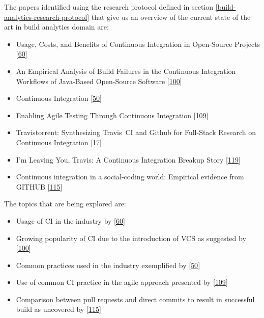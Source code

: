 \documentclass[]{book}
\providecommand{\tightlist}{%
  \setlength{\itemsep}{0pt}\setlength{\parskip}{0pt}}
\begin{document}
The papers identified using the research protocol defined in section
\ref{build-analytics-research-protocol} that give us an overview of the
current state of the art in build analytics domain are:

\begin{itemize}
\tightlist
\item
  Usage, Costs, and Benefits of Continuous Integration in Open-Source
  Projects {[}\protect\hyperlink{ref-hilton2016usage}{60}{]}
\item
  An Empirical Analysis of Build Failures in the Continuous Integration
  Workflows of Java-Based Open-Source Software
  {[}\protect\hyperlink{ref-rausch2017empirical}{100}{]}
\item
  Continuous Integration
  {[}\protect\hyperlink{ref-fowler2006continuous}{50}{]}
\item
  Enabling Agile Testing Through Continuous Integration
  {[}\protect\hyperlink{ref-stolberg2009enabling}{109}{]}
\item
  Travistorrent: Synthesizing Travis~CI and Github for Full-Stack
  Research on Continuous Integration
  {[}\protect\hyperlink{ref-beller2017travistorrent}{17}{]}
\item
  I'm Leaving You, Travis: A Continuous Integration Breakup Story
  {[}\protect\hyperlink{ref-widder2018m}{119}{]}
\item
  Continuous integration in a social-coding world: Empirical evidence
  from GITHUB {[}\protect\hyperlink{ref-vasilescu2014continuous}{115}{]}
\end{itemize}

The topics that are being explored are:

\begin{itemize}
\tightlist
\item
  Usage of CI in the industry by
  {[}\protect\hyperlink{ref-hilton2016usage}{60}{]}
\item
  Growing popularity of CI due to the introduction of VCS as suggested
  by {[}\protect\hyperlink{ref-rausch2017empirical}{100}{]}
\item
  Common practices used in the industry exemplified by
  {[}\protect\hyperlink{ref-fowler2006continuous}{50}{]}
\item
  Use of common CI practice in the agile approach presented by
  {[}\protect\hyperlink{ref-stolberg2009enabling}{109}{]}
\item
  Comparison between pull requests and direct commits to result in
  successful build as uncovered by
  {[}\protect\hyperlink{ref-vasilescu2014continuous}{115}{]}
\end{itemize}
\end{document}
